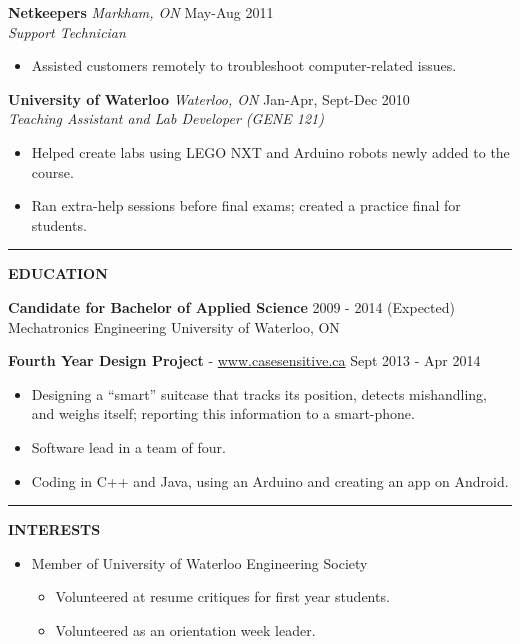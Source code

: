\documentclass{letter}
\begin{document}
{\bf Netkeepers} {\sl Markham, ON} \hfill May-Aug 2011 \\
{\sl Support Technician}
\begin{itemize}
  \item Assisted customers remotely to troubleshoot computer-related issues.
\end{itemize}

{\bf University of Waterloo} {\sl Waterloo, ON} \hfill Jan-Apr, Sept-Dec 2010 \\
{\sl Teaching Assistant and Lab Developer (GENE 121)}
\begin{itemize}
  \item Helped create labs using LEGO NXT and Arduino robots newly added to the course.
  \item Ran extra-help sessions before final exams; created a practice final for students.
\end{itemize}

\vskip 2pt
\hrule
{\large\bf EDUCATION}

{\bf Candidate for Bachelor of Applied Science} \hfill 2009 - 2014 (Expected) \\
Mechatronics Engineering \hfill University of Waterloo, ON

{\bf Fourth Year Design Project} - \href{http://www.casesensitive.ca}{www.casesensitive.ca} \hfill Sept 2013 - Apr 2014
\begin{itemize}
  \item Designing a ``smart'' suitcase that tracks its position, detects mishandling, and weighs itself; reporting this information to a smart-phone.
  \item Software lead in a team of four.
  \item Coding in C++ and Java, using an Arduino and creating an app on Android.
\end{itemize}

\vskip 2pt
\hrule
{\large\bf INTERESTS}
\begin{itemize}
  \item Member of University of Waterloo Engineering Society
  \begin{itemize}
    \item Volunteered at resume critiques for first year students.
    \item Volunteered as an orientation week leader.
  \end{itemize}
\end{itemize}
\end{document}
